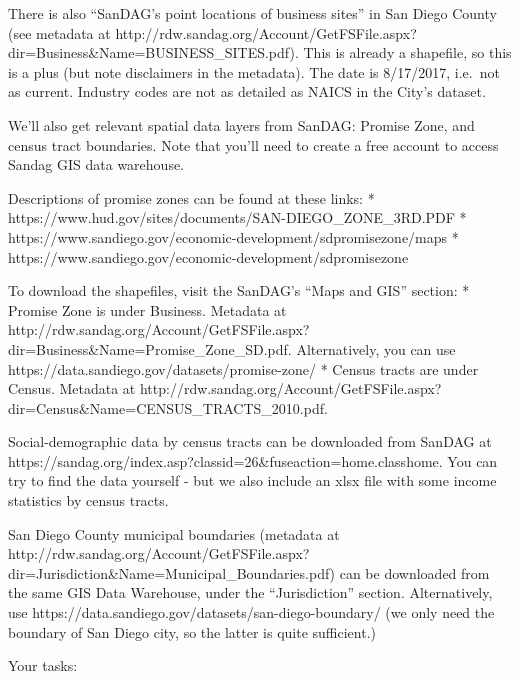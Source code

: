 \documentclass[11pt]{article}
\begin{document}
There is also ``SanDAG's point locations of business sites'' in San
Diego County (see metadata at
http://rdw.sandag.org/Account/GetFSFile.aspx?dir=Business\&Name=BUSINESS\_SITES.pdf).
This is already a shapefile, so this is a plus (but note disclaimers in
the metadata). The date is 8/17/2017, i.e.~not as current. Industry
codes are not as detailed as NAICS in the City's dataset.

We'll also get relevant spatial data layers from SanDAG: Promise Zone,
and census tract boundaries. Note that you'll need to create a free
account to access Sandag GIS data warehouse.

Descriptions of promise zones can be found at these links: *
https://www.hud.gov/sites/documents/SAN-DIEGO\_ZONE\_3RD.PDF *
https://www.sandiego.gov/economic-development/sdpromisezone/maps *
https://www.sandiego.gov/economic-development/sdpromisezone

To download the shapefiles, visit the SanDAG's ``Maps and GIS'' section:
* Promise Zone is under Business. Metadata at
http://rdw.sandag.org/Account/GetFSFile.aspx?dir=Business\&Name=Promise\_Zone\_SD.pdf.
Alternatively, you can use
https://data.sandiego.gov/datasets/promise-zone/ * Census tracts are
under Census. Metadata at
http://rdw.sandag.org/Account/GetFSFile.aspx?dir=Census\&Name=CENSUS\_TRACTS\_2010.pdf.

Social-demographic data by census tracts can be downloaded from SanDAG
at https://sandag.org/index.asp?classid=26\&fuseaction=home.classhome.
You can try to find the data yourself - but we also include an xlsx file
with some income statistics by census tracts.

San Diego County municipal boundaries (metadata at
http://rdw.sandag.org/Account/GetFSFile.aspx?dir=Jurisdiction\&Name=Municipal\_Boundaries.pdf)
can be downloaded from the same GIS Data Warehouse, under the
``Jurisdiction'' section. Alternatively, use
https://data.sandiego.gov/datasets/san-diego-boundary/ (we only need the
boundary of San Diego city, so the latter is quite sufficient.)

Your tasks:
\end{document}
